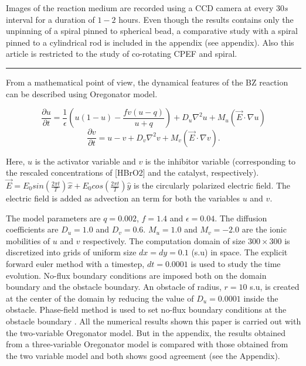 \documentclass[%
 preprint,
 amsmath,amssymb,
 aps,
]{revtex4-2}
\begin{document}
Images of the reaction medium are recorded using a CCD camera at every $30 s$ interval for a duration of $1-2$ hours. Even though the results contains only the unpinning of a spiral pinned to spherical bead, a comparative study with a spiral pinned to a cylindrical rod is included in the appendix (see appendix).
Also this article is restricted to the study of co-rotating CPEF and spiral.

\vspace{5pt}
\hrule
\vspace{5pt}

From a mathematical point of view, the dynamical features of the BZ reaction can be described using Oregonator model. 

\begin{equation}\label{E_uoregonator}
\frac{\partial u}{\partial t}=\frac{1}{\epsilon}(u(1-u)-\frac{fv(u-q)}{u+q})
+D_{u}\nabla^2u+M_{u}(\vec{E} \cdot \nabla u)
\end{equation}
\begin{equation}\label{E_voregonator}
\frac{\partial v}{\partial t}=u-v+D_{v}\nabla^2v+M_{v}(\vec{E} \cdot \nabla v).
\end{equation}

Here, $u$ is the activator variable and $v$ is the inhibitor variable (corresponding to the rescaled concentrations of [HBrO2] and the catalyst, respectively). $\vec{E} = E_{0} sin(\frac{2\pi t}{T})\hat{x} + E_{0} cos(\frac{2\pi t}{T})\hat{y}$ is the circularly polarized electric field. The electric field is added as advection an term for both the variables $u$ and $v$. 

The model parameters are $q = 0.002$, $f = 1.4$ and $\epsilon=0.04$. The diffusion coefficients are $D_{u}=1.0$ and $D_{v}=0.6$. $M_{u}=1.0$ and $M_{v}=-2.0$ are the ionic mobilities of $u$ and $v$ respectively. The computation domain of size $300 \times 300$ is discretized into grids of uniform size $dx=dy=0.1$ (s.u) in space. The explicit forward euler method with a timestep, $dt=0.0001$ is used to study the time evolution. No-flux boundary conditions are imposed both on the domain boundary and the obstacle boundary. An obstacle of radius, $r = 10$ s.u, is created at the center of the domain by reducing the value of $D_{u}=0.0001$ inside the obstacle. Phase-field method is used to set no-flux boundary conditions at the obstacle boundary \cite{fenton2005modeling}. 
All the numerical results shown this paper is carried out with the two-variable Oregonator model. But in the appendix, the results obtained from a three-variable Oregonator model is compared with those obtained from the two variable model and both shows good agreement (see the Appendix).
 
\end{document}
